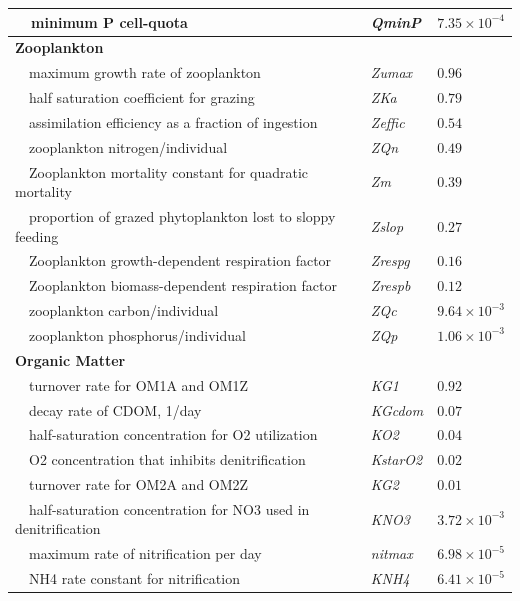 \documentclass[preprint]{elsarticle}\usepackage[]{graphicx}\usepackage[]{color}
\begin{document}
\begin{table}[!tbp]
{\begin{center}
\begin{tabular}{lll}
~~minimum P cell-quota&\textit{QminP}&$7.35\times 10^{-4}$\tabularnewline
\hline
{\bfseries Zooplankton}&&\tabularnewline
~~maximum growth rate of zooplankton&\textit{Zumax}&$0.96$\tabularnewline
~~half saturation coefficient for grazing&\textit{ZKa}&$0.79$\tabularnewline
~~assimilation efficiency as a fraction of ingestion&\textit{Zeffic}&$0.54$\tabularnewline
~~zooplankton nitrogen/individual&\textit{ZQn}&$0.49$\tabularnewline
~~Zooplankton mortality constant for quadratic mortality&\textit{Zm}&$0.39$\tabularnewline
~~proportion of grazed phytoplankton lost to sloppy feeding&\textit{Zslop}&$0.27$\tabularnewline
~~Zooplankton growth-dependent respiration factor&\textit{Zrespg}&$0.16$\tabularnewline
~~Zooplankton biomass-dependent respiration factor&\textit{Zrespb}&$0.12$\tabularnewline
~~zooplankton carbon/individual&\textit{ZQc}&$9.64\times 10^{-3}$\tabularnewline
~~zooplankton phosphorus/individual&\textit{ZQp}&$1.06\times 10^{-3}$\tabularnewline
\hline
{\bfseries Organic Matter}&&\tabularnewline
~~turnover rate for OM1A and OM1Z&\textit{KG1}&$0.92$\tabularnewline
~~decay rate of CDOM, 1/day&\textit{KGcdom}&$0.07$\tabularnewline
~~half-saturation concentration for O2 utilization&\textit{KO2}&$0.04$\tabularnewline
~~O2 concentration that inhibits denitrification&\textit{KstarO2}&$0.02$\tabularnewline
~~turnover rate for OM2A and OM2Z&\textit{KG2}&$0.01$\tabularnewline
~~half-saturation concentration for NO3 used in denitrification&\textit{KNO3}&$3.72\times 10^{-3}$\tabularnewline
~~maximum rate of nitrification per day&\textit{nitmax}&$6.98\times 10^{-5}$\tabularnewline
~~NH4 rate constant for nitrification&\textit{KNH4}&$6.41\times 10^{-5}$\tabularnewline
\hline
\end{tabular}\end{center}}
\end{table}
\end{document}
